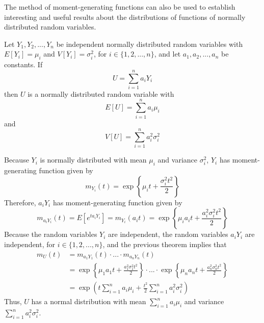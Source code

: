 \documentclass[12pt, a4paper, twoside, openright, titlepage]{book}
\begin{document}
The method of moment-generating functions can also be used to establish interesting and useful results about the distributions of functions of normally distributed random variables.

\begin{thm}{}{}
    Let $Y_1,Y_2,...,Y_n$ be independent normally distributed random variables with $E[Y_i] = \mu_i$ and $V[Y_i] = \sigma_i^2$, for $i \in \{1,2,...,n\}$, and let $a_1,a_2,...,a_n$ be constants. If \begin{equation*}
        U = \sum\limits_{i=1}^na_iY_i
    \end{equation*}
    then $U$ is a normally distributed random variable with \begin{equation*}
        E[U] = \sum\limits_{i=1}^na_i\mu_i
    \end{equation*}
    and \begin{equation*}
        V[U] = \sum\limits_{i=1}^na_i^2\sigma_i^2
    \end{equation*}
\end{thm}
\begin{proof*}{}{}
    Because $Y_i$ is normally distributed with mean $\mu_i$ and variance $\sigma_i^2$, $Y_i$ has moment-generating function given by \begin{equation*}
        m_{Y_i}(t) = \exp\left\{\mu_i t + \frac{\sigma_i^2t^2}{2}\right\}
    \end{equation*}
    Therefore, $a_iY_i$ has moment-generating function given by \begin{equation*}
        m_{a_iY_i}(t) = E[e^{ta_iY_i}] = m_{Y_i}(a_it) = \exp\left\{\mu_ia_it + \frac{a_i^2\sigma_i^2t^2}{2}\right\}
    \end{equation*}
    Because the random variables $Y_i$ are independent, the random variables $a_iY_i$ are independent, for $i \in \{1,2,...,n\}$, and the previous theorem implies that \begin{align*}
        m_U(t) &= m_{a_1Y_1}(t)\cdot...\cdot m_{a_nY_n}(t) \\
        &= \exp\left\{\mu_1a_1t + \frac{a_1^2\sigma_1^2t^2}{2}\right\}\cdot...\cdot \exp\left\{\mu_na_nt + \frac{a_n^2\sigma_n^2t^2}{2}\right\} \\
        &= \exp\left(t\sum\limits_{i=1}^na_i\mu_i + \frac{t^2}{2}\sum\limits_{i=1}^na_i^2\sigma_i^2\right)
    \end{align*}
    Thus, $U$ has a normal distribution with mean $\sum\limits_{i=1}^na_i\mu_i$ and variance $\sum\limits_{i=1}^na_i^2\sigma_i^2$.
\end{proof*}
\end{document}
